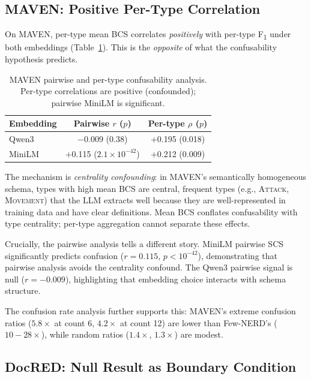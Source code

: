 \documentclass[11pt,a4paper]{article}
\newcommand{\fone}{F\textsubscript{1}}
\begin{document}
\subsection{MAVEN: Positive Per-Type Correlation}

On MAVEN, per-type mean BCS correlates \emph{positively} with per-type \fone{} under both embeddings (Table~\ref{tab:maven_pertype}).
This is the \emph{opposite} of what the confusability hypothesis predicts.

\begin{table}[t]
\centering
\caption{MAVEN pairwise and per-type confusability analysis. Per-type correlations are positive (confounded); pairwise MiniLM is significant.}
\label{tab:maven_pertype}
\small
\begin{tabular}{lcc}
\toprule
\textbf{Embedding} & \textbf{Pairwise $r$ ($p$)} & \textbf{Per-type $\rho$ ($p$)} \\
\midrule
Qwen3  & $-$0.009 (0.38) & $+$0.195 (0.018) \\
MiniLM & $+$0.115 ($2.1{\times}10^{-42}$) & $+$0.212 (0.009) \\
\bottomrule
\end{tabular}
\end{table}

The mechanism is \emph{centrality confounding}: in MAVEN's semantically homogeneous schema, types with high mean BCS are central, frequent types (e.g., \textsc{Attack}, \textsc{Movement}) that the LLM extracts well because they are well-represented in training data and have clear definitions.
Mean BCS conflates confusability with type centrality; per-type aggregation cannot separate these effects.

Crucially, the pairwise analysis tells a different story.
MiniLM pairwise SCS significantly predicts confusion ($r{=}0.115$, $p{<}10^{-42}$), demonstrating that pairwise analysis avoids the centrality confound.
The Qwen3 pairwise signal is null ($r{=}{-}0.009$), highlighting that embedding choice interacts with schema structure.

The confusion rate analysis further supports this: MAVEN's extreme confusion ratios ($5.8{\times}$ at count 6, $4.2{\times}$ at count 12) are lower than Few-NERD's ($10{-}28{\times}$), while random ratios ($1.4{\times}$, $1.3{\times}$) are modest.

\subsection{DocRED: Null Result as Boundary Condition}
\end{document}
